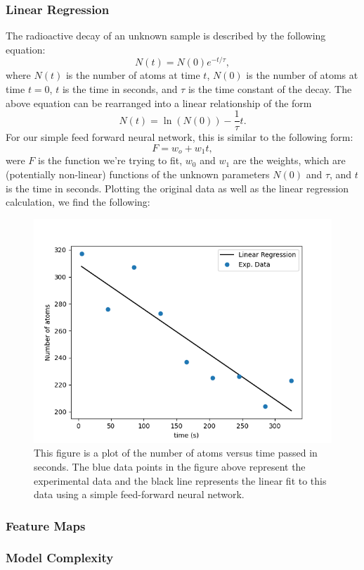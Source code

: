 \subsubsection{Linear Regression}
The radioactive decay of an unknown sample is described by the following equation:
\begin{equation}
N(t) = N(0) e^{-t/\tau},
\end{equation}
where $N(t)$ is the number of atoms at time $t$, $N(0)$ is the number of atoms at time $t=0$, $t$ is the time in seconds, and $\tau$ is the time constant of the decay. The above equation can be rearranged into a linear relationship of the form 
\begin{equation}
N(t) = \ln{\left( N(0) \right)} - \frac{1}{\tau}t.
\end{equation}
For our simple feed forward neural network, this is similar to the following form:
\begin{equation}
F = w_o + w_1t,
\end{equation}
were $F$ is the function we're trying to fit, $w_0$ and $w_1$ are the weights, which are (potentially non-linear) functions of the unknown parameters $N(0)$ and $\tau$, and $t$ is the time in seconds. Plotting the original data as well as the linear regression calculation, we find the following:
\begin{figure}[H]
\centering
\includegraphics[scale=0.75]{../figures/decay_data.png}
\caption{This figure is a plot of the number of atoms versus time passed in seconds. The blue data points in the figure above represent the experimental data and the black line represents the linear fit to this data using a simple feed-forward neural network.}
\end{figure}

\subsubsection{Feature Maps}

\subsubsection{Model Complexity}